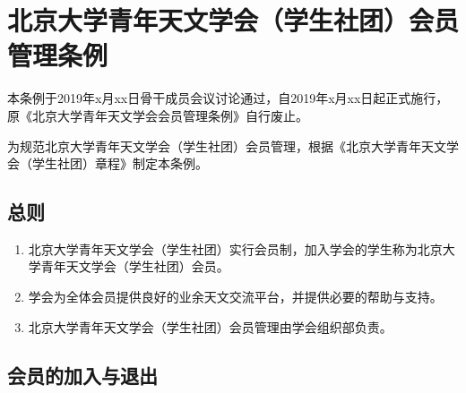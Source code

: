 \chapter{北京大学青年天文学会（学生社团）会员管理条例}

本条例于2019年x月xx日骨干成员会议讨论通过，自2019年x月xx日起正式施行，原《北京大学青年天文学会会员管理条例》自行废止。

为规范北京大学青年天文学会（学生社团）会员管理，根据《北京大学青年天文学会（学生社团）章程》制定本条例。

\section{总则}

\begin{enumerate}
    \item 北京大学青年天文学会（学生社团）实行会员制，加入学会的学生称为北京大学青年天文学会（学生社团）会员。
    
    \item 学会为全体会员提供良好的业余天文交流平台，并提供必要的帮助与支持。
    
    \item 北京大学青年天文学会（学生社团）会员管理由学会组织部负责。
\end{enumerate}

\section{会员的加入与退出}

